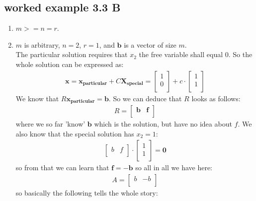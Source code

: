 \documentclass[a4paper,11pt]{article}
\newcommand{\mybf}[1]{\boldsymbol{#1}}
\begin{document}
\subsection*{worked example 3.3 B}
\begin{enumerate}
\item $m>=n=r$.
\item $m$ is arbitrary, $n=2$, $r=1$, and $\mybf{b}$ is a vector of size $m$. \\
The particular solution requires that $x_2$ the free variable shall equal 0. So the whole solution can be expressed as:
\begin{align}
\mybf{x} = \mybf{x_{particular}} + C \mybf{X_{special}} = 
\begin{bmatrix}
1 \\
0 \\
\end{bmatrix}
+ c \cdot 
\begin{bmatrix}
1 \\
1 \\
\end{bmatrix}
\end{align}
We know that $R \mybf{x_{particular}} = \mybf{b}$. So we can deduce that $R$ looks as follows:
\begin{align}
R = 
\begin{bmatrix}
\mybf{b} & \mybf{f}\\
\end{bmatrix}
\end{align}
where we so far 'know' $\mybf{b}$ which is the solution, but have no idea about $f$.
We also know that the special solution has $x_2=1$:
\begin{align}
\begin{bmatrix}
b & f\\
\end{bmatrix}
\cdot 
\begin{bmatrix}
1 \\
1 \\
\end{bmatrix}
= \mybf{0}
\end{align}
so from that we can learn that $\mybf{f}=-\mybf{b}$
so all in all we have here:
\begin{align}
A = 
\begin{bmatrix}
b & -b\\
\end{bmatrix} 
\end{align}
so basically the following tells the whole story:
\begin{align}

\end{align}
\end{enumerate}
\end{document}
